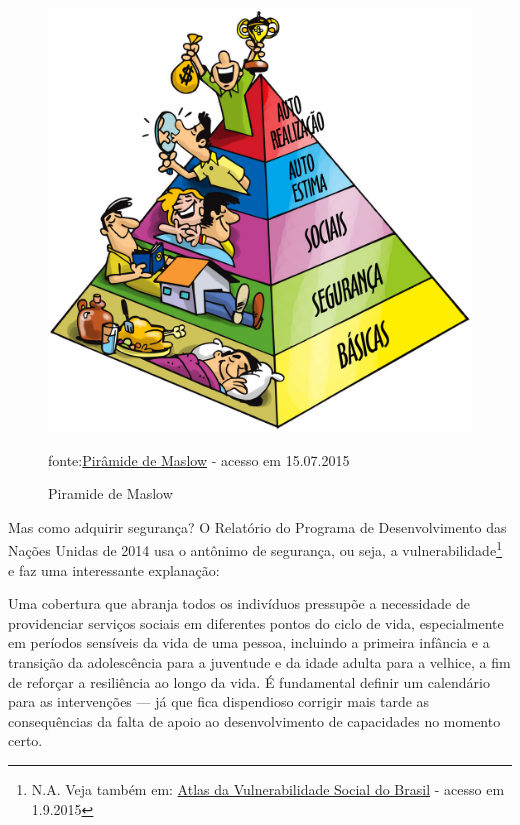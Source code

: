 \documentclass[
	12pt,				%
	openright,			%
	twoside,			%
	a4paper,			%
	chapter=TITLE,		%
	section=TITLE,		%
	subsection=TITLE,	%
	subsubsection=TITLE,%
	spanish,            %
	english,			%
	brazil				%
	]{abntex2}
\begin{document}
\begin{figure}[!htpb]%
	\caption{Piramide de Maslow}
	\begin{center}
	\includegraphics[scale=0.35]{Maslow.jpg}
	\end{center}
	\ABNTEXchapterfont\small{fonte:\href{http://accorh-consultor-wjlemus.blogspot.com.br/2013/10/que-tan-conrrecta-es-la-piramide-de.html}{Pirâmide de Maslow} - acesso em 15.07.2015}
	\label{Maslow}
\end{figure} 
\FloatBarrier
Mas como adquirir segurança? O Relatório do Programa de Desenvolvimento das Nações Unidas de 2014
 usa o antônimo de segurança, ou seja, a vulnerabilidade\footnote{N.A. Veja também em: \href{http://www.ipea.gov.br/portal/index.php?option=com_content&view=article&id=26118&Itemid=383}{Atlas da Vulnerabilidade Social do Brasil} - acesso em 1.9.2015} e faz uma interessante
explanação:
\begin{citacao}
	Uma cobertura que abranja todos os indivíduos pressupõe a necessidade de providenciar serviços
	sociais em diferentes pontos do ciclo de vida, especialmente em períodos sensíveis da vida de uma
	pessoa, incluindo a primeira infância e a transição da adolescência para a juventude e da idade
	adulta para a velhice, a fim de reforçar a resiliência ao longo da vida. É fundamental definir um
	calendário para as intervenções — já que fica dispendioso corrigir mais tarde as consequências da
	falta de apoio ao desenvolvimento de capacidades no momento certo.\cite[p. ~91]{PNUD2014}
\end{citacao}
\end{document}
